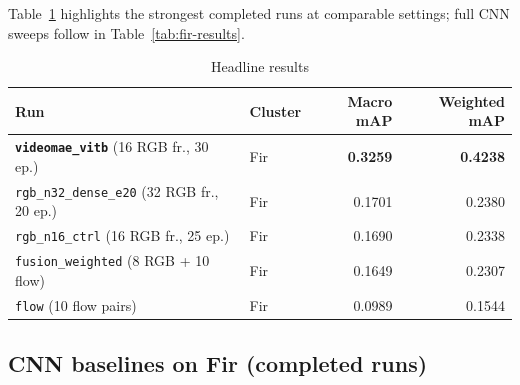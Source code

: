 \documentclass[11pt,a4paper]{article}
\begin{document}
\noindent
Table~\ref{tab:headline} highlights the strongest completed runs at comparable settings;
full CNN sweeps follow in Table~\ref{tab:fir-results}.

\begin{table}[h]
\centering
\caption{Headline results }
\label{tab:headline}
\small
\begin{tabular}{@{}llrr@{}}
\toprule
Run & Cluster & Macro mAP & Weighted mAP \\
\midrule
\textbf{\texttt{videomae\_vitb}} (16 RGB fr., 30 ep.) & Fir & \textbf{0.3259} & \textbf{0.4238} \\
\texttt{rgb\_n32\_dense\_e20} (32 RGB fr., 20 ep.) & Fir & 0.1701 & 0.2380 \\
\texttt{rgb\_n16\_ctrl} (16 RGB fr., 25 ep.) & Fir & 0.1690 & 0.2338 \\
\texttt{fusion\_weighted} (8 RGB + 10 flow) & Fir & 0.1649 & 0.2307 \\
\texttt{flow} (10 flow pairs) & Fir & 0.0989 & 0.1544 \\
\bottomrule
\end{tabular}
\end{table}

\subsection{CNN baselines on Fir (completed runs)}
\end{document}
